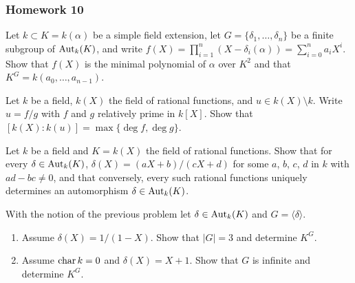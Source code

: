 \subsubsection{Homework 10}
\setcounter{exercise}{0}
\setcounter{equation}{0}

\begin{problem}
  Let $k\subset K=k(\alpha)$ be a simple field extension, let
  $G=\{\delta_1,\dotsc,\delta_n\}$ be a finite subgroup of
  $\operatorname{Aut}_k(K)$, and write
  $f(X)=\prod_{i=1}^n(X-\delta_i(\alpha))=\sum_{i=0}^na_iX^i$. Show
  that $f(X)$ is the minimal polynomial of $\alpha$ over $K^2$ and that
  $K^G=k(a_0,\dotsc,a_{n-1})$.
\end{problem}
\begin{solution}
\end{solution}

\begin{problem}
  Let $k$ be a field, $k(X)$ the field of rational functions, and
  $u\in k(X)\setminus k$. Write $u= f/g$ with $f$ and $g$
  relatively prime in $k[X]$. Show that
  $[k(X):k(u)]=\max\{\deg f,\deg g\}$.
\end{problem}
\begin{solution}
\end{solution}

\begin{problem}
  Let $k$ be a field and $K= k(X)$ the field of rational
  functions. Show that for every $\delta\in\operatorname{Aut}_k(K)$,
  $\delta(X)= (aX+b)/(cX+d)$ for some $a$, $b$, $c$, $d$ in $k$ with
  $ad-bc\neq 0$, and that conversely, every such rational functions
  uniquely determines an automorphism $\delta\in\operatorname{Aut}_k(K)$.
\end{problem}
\begin{solution}
\end{solution}

\begin{problem}
With the notion of the previous problem let $\delta\in\operatorname{Aut}_k(K)$ and
$G=\langle \delta \rangle$.
\begin{enumerate}[label=(\alph*),noitemsep]
\item Assume $\delta(X)=1/(1-X)$. Show that $|G|=3$ and determine $K^G$.
\item Assume $\operatorname{char} k=0$ and $\delta(X)=X+1$. Show that $G$ is infinite and
  determine $K^G$.
\end{enumerate}
\end{problem}
\begin{solution}
\end{solution}

